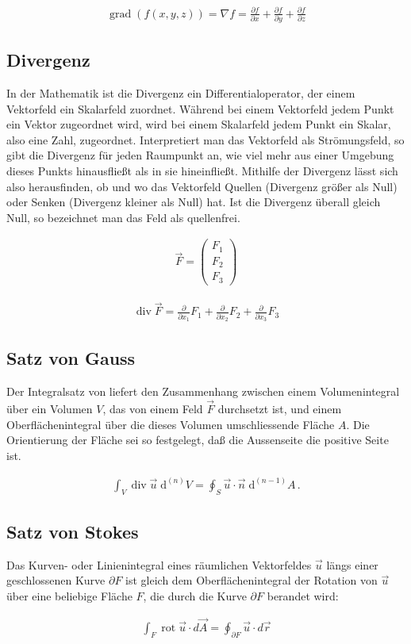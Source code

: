 \documentclass[a4paper]{scrartcl}
\begin{document}
\begin{align}
\operatorname{grad}(f(x,y,z)) = \nabla f = \frac{{\partial f}}{{\partial x}} +
\frac{{\partial f}}{{\partial y}} + \frac{{\partial f}}{{\partial z}} 
\end{align}
\subsection{Divergenz}
In der Mathematik ist die Divergenz ein Differentialoperator, der einem
Vektorfeld ein Skalarfeld zuordnet. Während bei einem Vektorfeld jedem Punkt ein
Vektor zugeordnet wird, wird bei einem Skalarfeld jedem Punkt ein Skalar, also
eine Zahl, zugeordnet. Interpretiert man das Vektorfeld als Strömungsfeld, so
gibt die Divergenz für jeden Raumpunkt an, wie viel mehr aus einer Umgebung
dieses Punkts hinausfließt als in sie hineinfließt. Mithilfe der Divergenz lässt
sich also herausfinden, ob und wo das Vektorfeld Quellen (Divergenz größer als
Null) oder Senken (Divergenz kleiner als Null) hat. Ist die Divergenz überall
gleich Null, so bezeichnet man das Feld als quellenfrei.

\begin{align}
\vec F = \begin{pmatrix} F_1 \\ F_2 \\ F_3 \end{pmatrix}
\end{align}

\begin{align}
\operatorname{div}\vec F =
\frac{\partial}{\partial x_1}F_1 + \frac{\partial}{\partial x_2}F_2+ \frac{\partial}{\partial x_3}F_3
\end{align}

\subsection{Satz von Gauss}
Der Integralsatz von  liefert den Zusammenhang zwischen einem 
Volumenintegral über ein Volumen $V$, das von einem Feld $\vec F$ durchsetzt
ist, und einem Oberflächenintegral über die dieses Volumen umschliessende
Fläche $A$. Die Orientierung der Fläche sei so festgelegt, daß die Aussenseite
die positive Seite ist.

\begin{align}
\int_V \operatorname{div} \vec u \; \mathrm d^{(n)}V = \oint_{S} \vec u \cdot
\vec n\; \mathrm d^{(n-1)}A\,.
\end{align}
\subsection{Satz von Stokes}
Das Kurven- oder Linienintegral eines räumlichen Vektorfeldes $\vec u$ längs
einer geschlossenen Kurve $\partial F$ ist gleich dem Oberflächenintegral der
Rotation von $\vec u$ über eine beliebige Fläche $F$, die durch die Kurve
$\partial F$ berandet wird:

\begin{align}
 \int_{F} \operatorname{rot} \vec u \cdot d \vec A =
\oint_{\partial F} \vec u \cdot d \vec r
\end{align}
\end{document}
